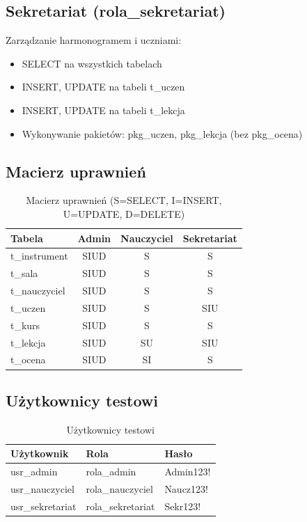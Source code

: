 \documentclass[12pt,a4paper]{article}
\begin{document}
\subsection{Sekretariat (rola\_sekretariat)}

Zarządzanie harmonogramem i uczniami:
\begin{itemize}[nosep]
    \item SELECT na wszystkich tabelach
    \item INSERT, UPDATE na tabeli t\_uczen
    \item INSERT, UPDATE na tabeli t\_lekcja
    \item Wykonywanie pakietów: pkg\_uczen, pkg\_lekcja (bez pkg\_ocena)
\end{itemize}

\subsection{Macierz uprawnień}

\begin{table}[h]
\centering
\begin{tabular}{|l|c|c|c|}
\hline
\textbf{Tabela} & \textbf{Admin} & \textbf{Nauczyciel} & \textbf{Sekretariat} \\
\hline
t\_instrument & SIUD & S & S \\
t\_sala & SIUD & S & S \\
t\_nauczyciel & SIUD & S & S \\
t\_uczen & SIUD & S & SIU \\
t\_kurs & SIUD & S & S \\
t\_lekcja & SIUD & SU & SIU \\
t\_ocena & SIUD & SI & S \\
\hline
\end{tabular}
\caption{Macierz uprawnień (S=SELECT, I=INSERT, U=UPDATE, D=DELETE)}
\end{table}

\newpage

\subsection{Użytkownicy testowi}

\begin{table}[h]
\centering
\begin{tabular}{|l|l|l|}
\hline
\textbf{Użytkownik} & \textbf{Rola} & \textbf{Hasło} \\
\hline
usr\_admin & rola\_admin & Admin123! \\
usr\_nauczyciel & rola\_nauczyciel & Naucz123! \\
usr\_sekretariat & rola\_sekretariat & Sekr123! \\
\hline
\end{tabular}
\caption{Użytkownicy testowi}
\end{table}
\end{document}
